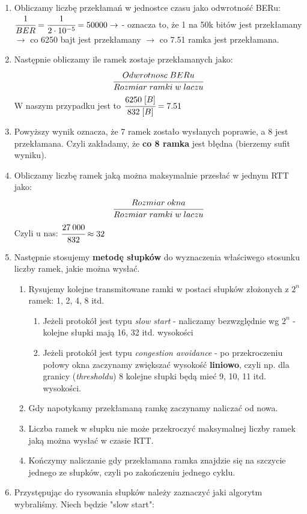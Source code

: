 			\begin{enumerate}
				\item Obliczamy liczbę przekłamań w jednostce czasu jako odwrotność BERu:
				$ \cfrac{1}{BER} = \cfrac{1}{2\cdot 10^{-5}}=50000 \rightarrow$ - oznacza to, że 1 na 50k bitów jest przekłamany $ \rightarrow $ co 6250 bajt jest przekłamany $ \rightarrow $ co 7.51 ramka jest przekłamana.
				\item Następnie obliczamy ile ramek zostaje przekłamanych jako:
				$$ \cfrac{Odwrotnosc\;BERu}{Rozmiar\;ramki\;w\;laczu} $$
				W naszym przypadku jest to $ \cfrac{6250\;[B]}{832\;[B]}=7.51$
				\item Powyższy wynik oznacza, że 7 ramek zostało wysłanych poprawie, a 8 jest przekłamana. Czyli zakładamy, że \textbf{co 8 ramka} jest błędna (bierzemy sufit wyniku).
				\item Obliczamy liczbę ramek jaką można maksymalnie przesłać w jednym RTT jako:
				$$ \cfrac{Rozmiar\;okna}{Rozmiar\;ramki\;w\;laczu} $$
				Czyli u nas: $ \cfrac{27\:000}{832}\approx32 $
				\item Następnie stosujemy \textbf{metodę słupków} do wyznaczenia właściwego stosunku liczby ramek, jakie można wysłać.
				\begin{enumerate}
					\item Rysujemy kolejne transmitowane ramki w postaci słupków złożonych z $ 2^n $ ramek: 1, 2, 4, 8 itd.
					\begin{enumerate}
						\item Jeżeli protokół jest typu \emph{slow start} - naliczamy bezwzględnie wg $ 2^n $ - kolejne słupki mają 16, 32 itd. wysokości
						\item Jeżeli protokół jest typu \emph{congestion avoidance} - po przekroczeniu połowy okna zaczynamy zwiększać wysokość \textbf{liniowo}, czyli np. dla granicy (\emph{thresholdu}) 8 kolejne słupki będą mieć 9, 10, 11 itd. wysokości.
					\end{enumerate}
					\item Gdy napotykamy przekłamaną ramkę zaczynamy naliczać od nowa.
					\item Liczba ramek w słupku nie może przekroczyć maksymalnej liczby ramek jaką można wysłać w czasie RTT.
					\item Kończymy naliczanie gdy przekłamana ramka znajdzie się na szczycie jednego ze słupków, czyli po zakończeniu jednego cyklu.
				\end{enumerate}
				\item Przystępując do rysowania słupków należy zaznaczyć jaki algorytm wybraliśmy. Niech będzie "slow start":\\

\end{enumerate}
